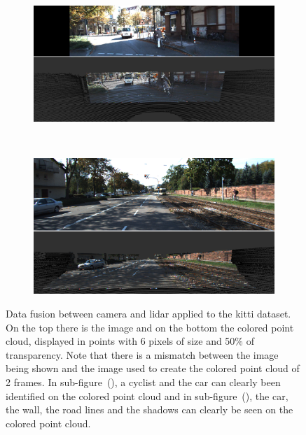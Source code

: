 \begin{figure}[!ht]
	\centering
	\begin{subfigure}[c]{0.8\textwidth}
		\includegraphics[width=\textwidth]{img/sensor_fusion/kitti-sensor-fusion-1.png}
		\caption{}
		\label{fig:kitti-sensor-fusion-1}
	\end{subfigure}
	\\ \vspace{4mm}
	\begin{subfigure}[c]{0.8\textwidth}
		\includegraphics[width=\textwidth]{img/sensor_fusion/kitti-sensor-fusion-2.png}
		\caption{}
		\label{fig:kitti-sensor-fusion-2}
	\end{subfigure}
	\caption{Data fusion between camera and \ac{lidar} applied to the \ac{kitti} dataset. On the top there is the image and on the bottom the colored point cloud, displayed in points with 6 pixels of size and 50\% of transparency. Note that there is a mismatch between the image being shown and the image used to create the colored point cloud of 2 frames. In sub-figure~(), a cyclist and the car can clearly been identified on the colored point cloud and in sub-figure~(), the car, the wall, the road lines and the shadows can clearly be seen on the colored point cloud.}
	\label{fig:kitti-sensor-fusion}
\end{figure}


